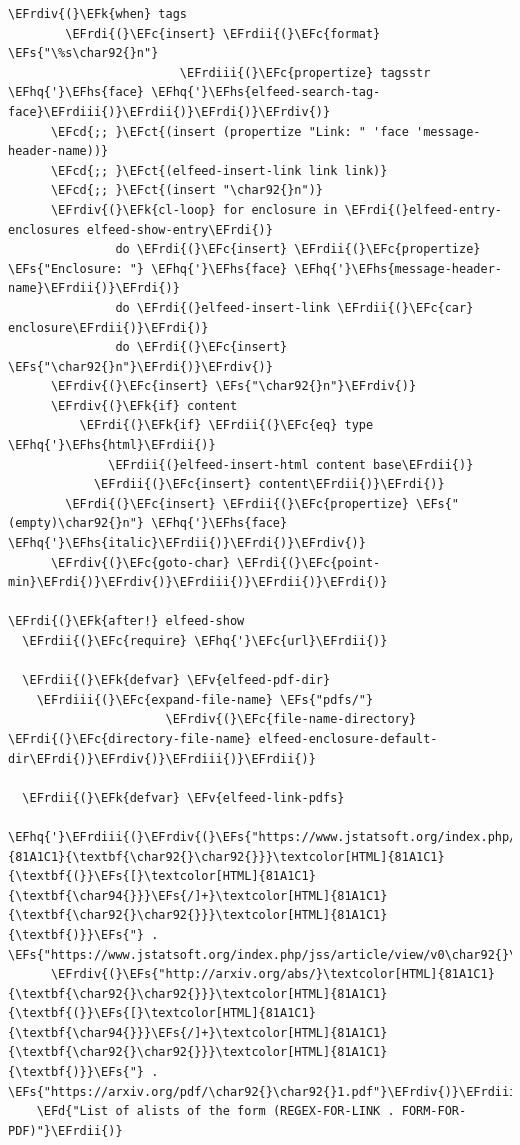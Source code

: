 \documentclass{scrartcl}
\newcommand{\EFk}[1]{\textcolor{EFk}{#1}} %
\newcommand{\EFd}[1]{\textcolor{EFd}{#1}} %
\newcommand{\EFs}[1]{\textcolor{EFs}{#1}} %
\newcommand{\EFct}[1]{\textcolor{EFct}{#1}} %
\newcommand{\EFc}[1]{\textcolor{EFc}{#1}} %
\newcommand{\EFv}[1]{\textcolor{EFv}{#1}} %
\newcommand{\EFcd}[1]{\textcolor{EFcd}{#1}} %
\newcommand{\EFhq}[1]{#1} %
\newcommand{\EFhs}[1]{#1} %
\newcommand{\EFrdi}[1]{#1} %
\newcommand{\EFrdii}[1]{#1} %
\newcommand{\EFrdiii}[1]{#1} %
\newcommand{\EFrdiv}[1]{#1} %
\begin{document}
\begin{Code}
\begin{Verbatim}[]
      \EFrdiv{(}\EFk{when} tags
        \EFrdi{(}\EFc{insert} \EFrdii{(}\EFc{format} \EFs{"\%s\char92{}n"}
                        \EFrdiii{(}\EFc{propertize} tagsstr \EFhq{'}\EFhs{face} \EFhq{'}\EFhs{elfeed-search-tag-face}\EFrdiii{)}\EFrdii{)}\EFrdi{)}\EFrdiv{)}
      \EFcd{;; }\EFct{(insert (propertize "Link: " 'face 'message-header-name))}
      \EFcd{;; }\EFct{(elfeed-insert-link link link)}
      \EFcd{;; }\EFct{(insert "\char92{}n")}
      \EFrdiv{(}\EFk{cl-loop} for enclosure in \EFrdi{(}elfeed-entry-enclosures elfeed-show-entry\EFrdi{)}
               do \EFrdi{(}\EFc{insert} \EFrdii{(}\EFc{propertize} \EFs{"Enclosure: "} \EFhq{'}\EFhs{face} \EFhq{'}\EFhs{message-header-name}\EFrdii{)}\EFrdi{)}
               do \EFrdi{(}elfeed-insert-link \EFrdii{(}\EFc{car} enclosure\EFrdii{)}\EFrdi{)}
               do \EFrdi{(}\EFc{insert} \EFs{"\char92{}n"}\EFrdi{)}\EFrdiv{)}
      \EFrdiv{(}\EFc{insert} \EFs{"\char92{}n"}\EFrdiv{)}
      \EFrdiv{(}\EFk{if} content
          \EFrdi{(}\EFk{if} \EFrdii{(}\EFc{eq} type \EFhq{'}\EFhs{html}\EFrdii{)}
              \EFrdii{(}elfeed-insert-html content base\EFrdii{)}
            \EFrdii{(}\EFc{insert} content\EFrdii{)}\EFrdi{)}
        \EFrdi{(}\EFc{insert} \EFrdii{(}\EFc{propertize} \EFs{"(empty)\char92{}n"} \EFhq{'}\EFhs{face} \EFhq{'}\EFhs{italic}\EFrdii{)}\EFrdi{)}\EFrdiv{)}
      \EFrdiv{(}\EFc{goto-char} \EFrdi{(}\EFc{point-min}\EFrdi{)}\EFrdiv{)}\EFrdiii{)}\EFrdii{)}\EFrdi{)}

\EFrdi{(}\EFk{after!} elfeed-show
  \EFrdii{(}\EFc{require} \EFhq{'}\EFc{url}\EFrdii{)}

  \EFrdii{(}\EFk{defvar} \EFv{elfeed-pdf-dir}
    \EFrdiii{(}\EFc{expand-file-name} \EFs{"pdfs/"}
                      \EFrdiv{(}\EFc{file-name-directory} \EFrdi{(}\EFc{directory-file-name} elfeed-enclosure-default-dir\EFrdi{)}\EFrdiv{)}\EFrdiii{)}\EFrdii{)}

  \EFrdii{(}\EFk{defvar} \EFv{elfeed-link-pdfs}
    \EFhq{'}\EFrdiii{(}\EFrdiv{(}\EFs{"https://www.jstatsoft.org/index.php/jss/article/view/v0}\textcolor[HTML]{81A1C1}{\textbf{\char92{}\char92{}}}\textcolor[HTML]{81A1C1}{\textbf{(}}\EFs{[}\textcolor[HTML]{81A1C1}{\textbf{\char94{}}}\EFs{/]+}\textcolor[HTML]{81A1C1}{\textbf{\char92{}\char92{}}}\textcolor[HTML]{81A1C1}{\textbf{)}}\EFs{"} . \EFs{"https://www.jstatsoft.org/index.php/jss/article/view/v0\char92{}\char92{}1/v\char92{}\char92{}1.pdf"}\EFrdiv{)}
      \EFrdiv{(}\EFs{"http://arxiv.org/abs/}\textcolor[HTML]{81A1C1}{\textbf{\char92{}\char92{}}}\textcolor[HTML]{81A1C1}{\textbf{(}}\EFs{[}\textcolor[HTML]{81A1C1}{\textbf{\char94{}}}\EFs{/]+}\textcolor[HTML]{81A1C1}{\textbf{\char92{}\char92{}}}\textcolor[HTML]{81A1C1}{\textbf{)}}\EFs{"} . \EFs{"https://arxiv.org/pdf/\char92{}\char92{}1.pdf"}\EFrdiv{)}\EFrdiii{)}
    \EFd{"List of alists of the form (REGEX-FOR-LINK . FORM-FOR-PDF)"}\EFrdii{)}


\end{Verbatim}
\end{Code}
\end{document}

